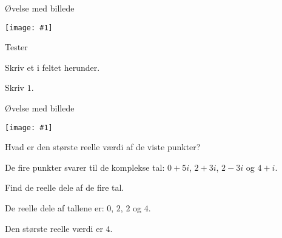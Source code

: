 \documentclass{article}
\newcommand{\image}[1]{\texttt{[image: \#1]}}
\begin{document}

\tableofcontents
\newpage

\begin{exercise}{Øvelse med billede}

\image{modulusandargument.png}


Tester

Skriv et i feltet herunder.



\hint
Skriv $1$.
\end{exercise}



\begin{exercise}{Øvelse med billede}

\image{argandplot.png}

Hvad er den største reelle værdi af de viste punkter?


\hint
De fire punkter svarer til de komplekse tal: 
$0 + 5i$, $2 + 3i$, $2 - 3i$ og $4 + i$.

\hint
Find de reelle dele af de fire tal.

\hint
De reelle dele af tallene er:
$0$, $2$, $2$ og $4$.

\hint
Den største reelle værdi er $4$.
\end{exercise}
\end{document}

